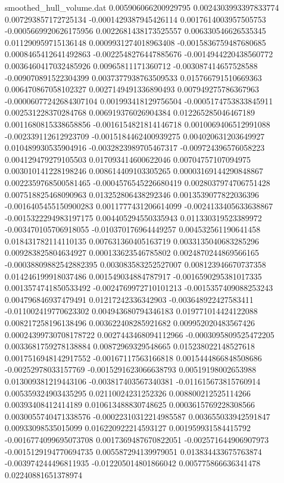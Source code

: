 \begin{filecontents}{smoothed_hull_volume.dat}
0.005906066200929795	0.0024303993397833774	0.007293857172725134	-0.0001429387945426114	0.0017614003957505753	-0.0005669920626175956	0.0022681438173525557	0.006330546626535345	0.011290959715136148	0.0009931274018963408	-0.0015836759487680685	0.0008465412641492863	-0.0022548276447885676	-0.0014944220438560772	0.0036460417032485926	0.00965811171360712	-0.003087414657528588	-0.009070891522304399	0.0037377938763509533	0.015766791510669363
0.006470867058102327	0.0027149491336890493	0.007949275786367963	-0.00006077242684307104	0.001993418129756504	-0.0005174753833845911	0.002531228370284768	0.006919376026904384	0.012265285046467189	0.0011680815338658856	-0.0016154821814146718	0.0010069406512991088	-0.002339112612923709	-0.0015184462400939275	0.004020631203649927	0.010489930535904916	-0.0032823989705467317	-0.009724396576058223	0.004129479279105503	0.017093414600622046
0.00704757107094975	0.003010141228198246	0.008614409103305265	0.00003169144290848867	0.0022359768500581465	-0.0004576545226680419	0.0028037974706751428	0.007518825468090963	0.013252806438292346	0.0013539077822036396	-0.0016405455150900283	0.0011777431206614099	-0.0024133405633638867	-0.0015322294983197175	0.004405294550335943	0.011330319523389972	-0.003470105706918055	-0.010370176964449257	0.004532561190641458	0.018431782114110135
0.007631360405163719	0.0033135040683285296	0.009283825804634927	0.000133623546785802	0.0024870244869566165	-0.00038809882542882395	0.003083583252527007	0.008123946670737358	0.014246199918037486	0.001549034884787917	-0.0016590295381017335	0.0013574741850533492	-0.0024769972710101213	-0.0015357409088253243	0.004796846937479491	0.01217242336342903	-0.003648922427583411	-0.011002419770623302	0.004943680794346183	0.019771014424122088
0.008217258196138496	0.003622408285921682	0.009952020483567426	0.00024399730708178722	0.0027443468094112966	-0.0003095809525472205	0.0033681759278138884	0.00872969329548665	0.015238022148527618	0.0017516948142917552	-0.00167117563166818	0.0015444866848508686	-0.00252978033157769	-0.0015291623066638793	0.00519198002653988	0.013009381219443106	-0.003817403567340381	-0.011615673815760914	0.005359324903435295	0.02110024231252326
0.008800212525114266	0.00393408412414189	0.010613488830748625	0.0003615769228308566	0.0030055740471338576	-0.00022310312214985587	0.003655033942591847	0.00933098535015099	0.016220922214593127	0.001959931584415792	-0.0016774099695073708	0.0017369487670822051	-0.002571644906907973	-0.0015129194770694735	0.005587294139979051	0.013834433675763874	-0.003974244496811935	-0.012205014801866042	0.005775866636341478	0.02240881651378974

\end{filecontents}
